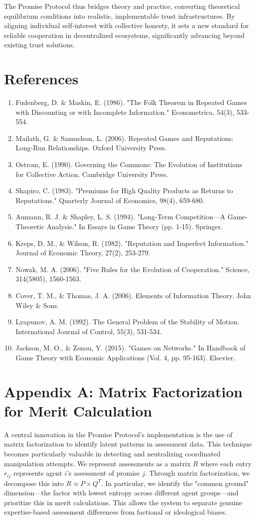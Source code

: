 \documentclass[11pt]{article}
\begin{document}
The Promise Protocol thus bridges theory and practice, converting theoretical equilibrium conditions into realistic, implementable trust infrastructures. By aligning individual self-interest with collective honesty, it sets a new standard for reliable cooperation in decentralized ecosystems, significantly advancing beyond existing trust solutions.
\section{References}
\label{sec:orgc9a8b9d}
\begin{enumerate}
\item Fudenberg, D. \& Maskin, E. (1986). "The Folk Theorem in Repeated Games with Discounting or with Incomplete Information." Econometrica, 54(3), 533-554.
\item Mailath, G. \& Samuelson, L. (2006). Repeated Games and Reputations: Long-Run Relationships. Oxford University Press.
\item Ostrom, E. (1990). Governing the Commons: The Evolution of Institutions for Collective Action. Cambridge University Press.
\item Shapiro, C. (1983). "Premiums for High Quality Products as Returns to Reputations." Quarterly Journal of Economics, 98(4), 659-680.
\item Aumann, R. J. \& Shapley, L. S. (1994). "Long-Term Competition—A Game-Theoretic Analysis." In Essays in Game Theory (pp. 1-15). Springer.
\item Kreps, D. M., \& Wilson, R. (1982). "Reputation and Imperfect Information." Journal of Economic Theory, 27(2), 253-279.
\item Nowak, M. A. (2006). "Five Rules for the Evolution of Cooperation." Science, 314(5805), 1560-1563.
\item Cover, T. M., \& Thomas, J. A. (2006). Elements of Information Theory. John Wiley \& Sons.
\item Lyapunov, A. M. (1992). The General Problem of the Stability of Motion. International Journal of Control, 55(3), 531-534.
\item Jackson, M. O., \& Zenou, Y. (2015). "Games on Networks." In Handbook of Game Theory with Economic Applications (Vol. 4, pp. 95-163). Elsevier.
\end{enumerate}
\section{Appendix A: Matrix Factorization for Merit Calculation}
\label{sec:orgaedb5e0}
A central innovation in the Promise Protocol's implementation is the use of matrix factorization to identify latent patterns in assessment data. This technique becomes particularly valuable in detecting and neutralizing coordinated manipulation attempts. We represent assessments as a matrix \(R\) where each entry \(r_{ij}\) represents agent \(i\)'s assessment of promise \(j\). Through matrix factorization, we decompose this into \(R \approx P \times Q^T\). In particular, we identify the "common ground" dimension—the factor with lowest entropy across different agent groups—and prioritize this in merit calculations. This allows the system to separate genuine expertise-based assessment differences from factional or ideological biases.
\end{document}
